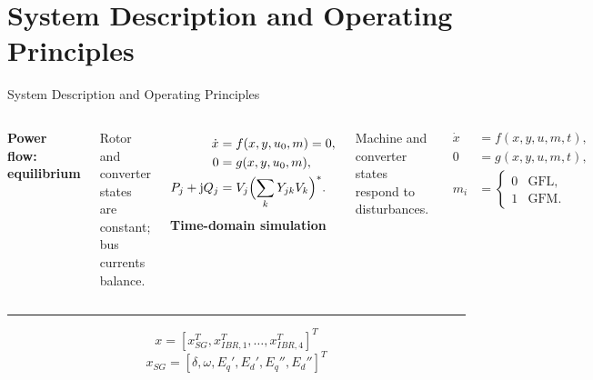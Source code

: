 \documentclass{beamer}
\begin{document}
\section{System Description and Operating Principles}
\begin{frame}{System Description and Operating Principles}
\footnotesize
\begin{columns}[t,onlytextwidth]
\textbf{Power flow: equilibrium}\par
Rotor and converter states are constant; bus currents balance.\par
\begin{align}
\dot x&=f(x,y,u_0,m)=0,\\
0&=g(x,y,u_0,m),\\
P_j+\mathrm jQ_j&=V_j\Bigl(\sum_kY_{jk}V_k\Bigr)^*.
\end{align}
\textbf{Time-domain simulation}\par
Machine and converter states respond to disturbances.\par
\begin{align}
\dot x&=f(x,y,u,m,t),\\
0&=g(x,y,u,m,t),\\
m_i&=\begin{cases}0&\text{GFL},\\1&\text{GFM}.\end{cases}
\end{align}
\end{columns}
\medskip\hrule\medskip
\begin{equation}
x=[x_{SG}^{T},x_{IBR,1}^{T},\ldots,x_{IBR,4}^{T}]^T
\end{equation}
\begin{equation}
x_{SG}=[\delta,\omega,E_q',E_d',E_q'',E_d'']^T
\end{equation}
\scriptsize

\end{frame}
\end{document}
